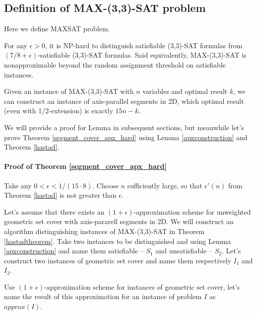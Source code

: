 \subsection{Definition of  MAX-(3,3)-SAT problem}
Here we define MAXSAT problem.

\begin{tw}{
	\label{hastadtheorem}
	\textbf{\cite{hastad}}
	
	For any $\epsilon > 0$, it is NP-hard to distinguish satisfiable
	(3,3)-SAT formulas from
	\linebreak\mbox{$(7/8 + \epsilon)$-satisfiable}
	(3,3)-SAT formulas. Said equivalently, MAX-(3,3)-SAT
	is nonapproximable beyond the random assignment threshold
	on satisfiable instances.
}\end{tw}

\begin{lemma}{
	\label{apxconstruction}
	Given an instance of  MAX-(3,3)-SAT 
	with $n$ variables and optimal result $k$,
	we can construct an instance of axis-parallel segments in 2D,
	which optimal result (even with 1/2-extension) is exactly $15n - k$.
}\end{lemma}

We will provide a proof for Lemma\label{apxconstruction} in
subsequent sections, but meanwhile let's prove
Theorem \ref{segment_cover_apx_hard} using Lemma \ref{apxconstruction}
and Theorem \ref{hastad}.

\paragraph{Proof of Theorem \ref{segment_cover_apx_hard}}
Take any $0 < \epsilon < 1/(15 \cdot 8)$.
Choose $n$ sufficiently large, so that $\epsilon'(n)$ from
Theorem \ref{hastad}
is not greater than $\epsilon$.

Let's assume that there exists an $(1+\epsilon)$-approximation scheme
for unweighted geometric set cover with axis-pararell segments in 2D.
We will construct an algorithm distinguishing instances of
MAX-(3,3)-SAT
in Theorem \ref{hastadtheorem}.
Take two instances to be distinguished and using
Lemma \ref{apxconstruction}
and name them satisfiable -- $S_1$ and unsatisfiable -- $S_2$.
Let's construct two instances of geometric set cover
and name them respectively $I_1$ and $I_2$.

Use $(1+\epsilon)$-approximation scheme for instances of geometric
set cover, let's name the result of this approximation
for an instance of problem $I$ as $approx(I)$.

